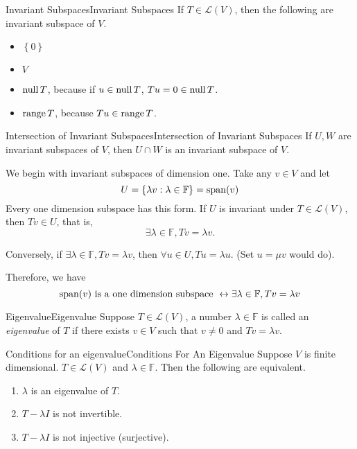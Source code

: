\documentclass[../main.tex]{subfiles}
\begin{document}
\begin{example}{Invariant Subspaces}{Invariant Subspaces}
If $T\in \mathscr{L}(V)$, then the following are invariant subspace of $V$.
\begin{itemize}
\item $\left\{ 0 \right\}$ 
\item $V$ 
\item $\operatorname{null} T$, because if $u\in \operatorname{null} T$, $Tu=0\in \operatorname{null} T$.
\item $\operatorname{range} T$, because $Tu\in \operatorname{range} T$.
\end{itemize}
\end{example}

\begin{proposition}{Intersection of Invariant Subspaces}{Intersection of Invariant Subspaces}
If $U,W$ are invariant subspaces of $V$, then $U\cap W$ is an invariant subspace of $V$.
\end{proposition}

We begin with invariant subspaces of dimension one.
Take any $v\in V$ and let
\begin{equation*}
U = \left\{ \lambda v: \lambda\in \mathbb{F} \right\} = \operatorname{span} (v)
\end{equation*}
Every one dimension subspace has this form. If $U$ is invariant under $T\in \mathscr{L}(V)$, then $Tv\in U$, that is, 
 \begin{equation*}
\exists \lambda\in \mathbb{F}, Tv = \lambda v.
\end{equation*}

Conversely, if $\exists \lambda\in \mathbb{F}, Tv = \lambda v$, then $\forall u\in U, Tu=\lambda u$. (Set $u=\mu v$ would do). 

Therefore, we have
\begin{equation*}
\operatorname{span} (v) \text{ is a one dimension subspace } \leftrightarrow \exists \lambda\in \mathbb{F}, Tv = \lambda v
\end{equation*}

\begin{definition}{Eigenvalue}{Eigenvalue}
Suppose $T\in \mathscr{L}(V)$, a number $\lambda \in \mathbb{F}$ is called an \emph{eigenvalue} of $T$ if there exists $v\in V$ such that $v\neq 0$ and $Tv= \lambda v$.
\end{definition}

\begin{theorem}{Conditions for an eigenvalue}{Conditions For An Eigenvalue}
Suppose $V$ is finite dimensional. $T\in \mathscr{L}(V)$ and $\lambda\in \mathbb{F}$. Then the following are equivalent.
\begin{enumerate}
	\item  $\lambda$ is an eigenvalue of $T$.
	\item $T-\lambda I$ is not invertible.
	\item $T-\lambda I$ is not injective (surjective).
\end{enumerate}
\end{theorem}
\end{document}
